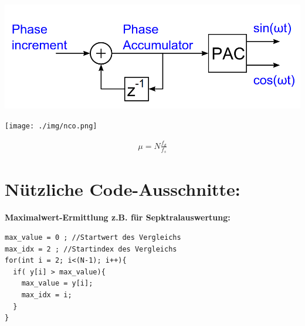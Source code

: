 \documentclass[10pt,a4paper]{article}
\begin{document}
\begin{center}
  \includegraphics[width=.5\textwidth]{./img/NCO_schema.png}
\end{center}

\begin{center}
    \texttt{[image: ./img/nco.png]}
\end{center}

  \begin{mdframed}[style=exercise]
    \begin{align}
        \mu = N \frac{f_d}{f_s}  
    \end{align}
  \end{mdframed}

\section{Nützliche Code-Ausschnitte:}
\textbf{Maximalwert-Ermittlung z.B. für Sepktralauswertung:}
\begin{verbatim}
max_value = 0 ; //Startwert des Vergleichs
max_idx = 2 ; //Startindex des Vergleichs
for(int i = 2; i<(N-1); i++){ 
  if( y[i] > max_value){
    max_value = y[i];
    max_idx = i;
  }
}
\end{verbatim}
\end{document}

